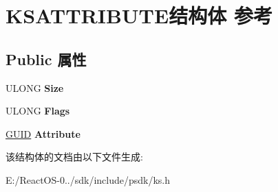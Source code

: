 \hypertarget{struct_k_s_a_t_t_r_i_b_u_t_e}{}\section{K\+S\+A\+T\+T\+R\+I\+B\+U\+T\+E结构体 参考}
\label{struct_k_s_a_t_t_r_i_b_u_t_e}
\subsection*{Public 属性}
\begin{DoxyCompactItemize}
\item 
\mbox{\label{struct_k_s_a_t_t_r_i_b_u_t_e_a5ad1665b8d8b08a7ad8bc621e44d3460}} 
U\+L\+O\+NG {\bfseries Size}
\item 
\mbox{\label{struct_k_s_a_t_t_r_i_b_u_t_e_a3db8e84ca1fa7ce31f2281dd0650d6f2}} 
U\+L\+O\+NG {\bfseries Flags}
\item 
\mbox{\label{struct_k_s_a_t_t_r_i_b_u_t_e_a7e42d726e33407d068a4dc74dc840ba4}} 
\hyperlink{interface_g_u_i_d}{G\+U\+ID} {\bfseries Attribute}
\end{DoxyCompactItemize}


该结构体的文档由以下文件生成\+:\begin{DoxyCompactItemize}
\item 
E\+:/\+React\+O\+S-\/0../sdk/include/psdk/ks.\+h\end{DoxyCompactItemize}
